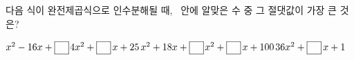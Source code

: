 다음 식이 완전제곱식으로 인수분해될 때, \blank\ 안에 알맞은 수 중 그 절댓값이 가장 큰 것은?
\begin{choices32}{$x^2-16x+\blank$}{$4x^2+\blank\mkern3mu x+25$}{$x^2+18x+\blank$}{$x^2+\blank\mkern3mu x+100$}{$36x^2+\blank\mkern3mu x+1$}\end{choices32}
